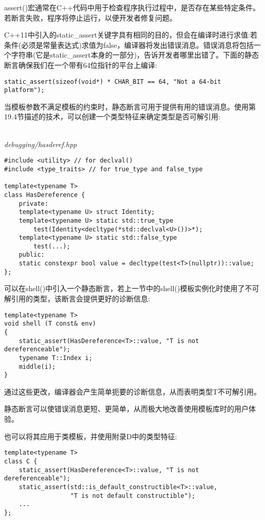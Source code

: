 assert()宏通常在C++代码中用于检查程序执行过程中，是否存在某些特定条件。若断言失败，程序将停止运行，以便开发者修复问题。

C++11中引入的static\_assert关键字具有相同的目的，但会在编译时进行求值:若条件(必须是常量表达式)求值为false，编译器将发出错误消息。错误消息将包括一个字符串(它是static\_assert本身的一部分)，告诉开发者哪里出错了。下面的静态断言确保我们在一个带有64位指针的平台上编译:

\begin{lstlisting}[style=styleCXX]
static_assert(sizeof(void*) * CHAR_BIT == 64, "Not a 64-bit platform");
\end{lstlisting}

当模板参数不满足模板的约束时，静态断言可用于提供有用的错误消息。使用第19.4节描述的技术，可以创建一个类型特征来确定类型是否可解引用:

\hspace*{\fill} \\ %
\noindent
\textit{debugging/hasderef.hpp}
\begin{lstlisting}[style=styleCXX]
#include <utility> // for declval()
#include <type_traits> // for true_type and false_type

template<typename T>
class HasDereference {
	private:
	template<typename U> struct Identity;
	template<typename U> static std::true_type
		test(Identity<decltype(*std::declval<U>())>*);
	template<typename U> static std::false_type
		test(...);
	public:
	static constexpr bool value = decltype(test<T>(nullptr))::value;
};
\end{lstlisting}

可以在shell()中引入一个静态断言，若上一节中的shell()模板实例化时使用了不可解引用的类型，该断言会提供更好的诊断信息:

\begin{lstlisting}[style=styleCXX]
template<typename T>
void shell (T const& env)
{
	static_assert(HasDereference<T>::value, "T is not dereferenceable");
	typename T::Index i;
	middle(i);
}
\end{lstlisting}

通过这些更改，编译器会产生简单扼要的诊断信息，从而表明类型T不可解引用。

静态断言可以使错误消息更短、更简单，从而极大地改善使用模板库时的用户体验。

也可以将其应用于类模板，并使用附录D中的类型特征:

\begin{lstlisting}[style=styleCXX]
template<typename T>
class C {
	static_assert(HasDereference<T>::value, "T is not dereferenceable");
	static_assert(std::is_default_constructible<T>::value,
				  "T is not default constructible");
	...
};
\end{lstlisting}




































